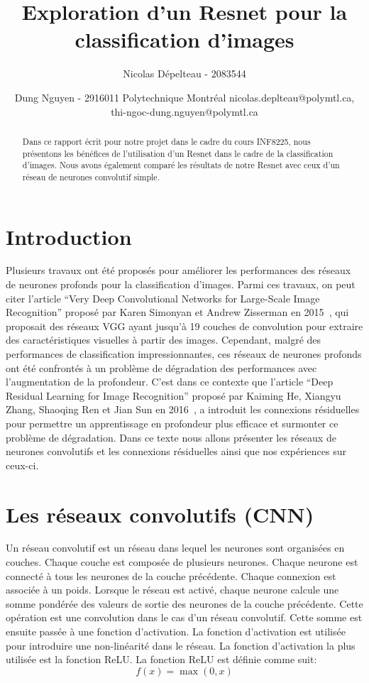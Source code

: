 \documentclass{article}
\title{Exploration d'un Resnet pour la classification d'images}
\author{
Nicolas Dépelteau - 2083544
\and
Dung Nguyen - 2916011
\affiliations{}
Polytechnique Montréal
\emails{}
nicolas.deplteau@polymtl.ca,
thi-ngoc-dung.nguyen@polymtl.ca
}
\begin{document}
\maketitle

\begin{abstract}
    Dans ce rapport écrit pour notre projet dans le cadre du cours INF8225,
    nous présentons les bénéfices de l'utilisation
    d'un Resnet dans le cadre de la classification d'images. Nous avons également comparé les
    résultats de notre Resnet avec ceux d'un réseau de neurones convolutif simple. 
\end{abstract}

\section{Introduction}

Plusieurs travaux ont été proposés pour améliorer les performances des réseaux de neurones profonds pour la classification d'images.
Parmi ces travaux, on peut citer l'article ``Very Deep Convolutional Networks for Large-Scale Image Recognition'' proposé par Karen
Simonyan et Andrew Zisserman en 2015~\cite{simonyan2015deep}, qui proposait des réseaux VGG ayant jusqu'à 19 couches de convolution pour extraire des
caractéristiques visuelles à partir des images.
Cependant, malgré des performances de classification impressionnantes, ces réseaux de neurones profonds ont été confrontés à un
problème de dégradation des performances avec l'augmentation de la profondeur.
C'est dans ce contexte que l'article ``Deep Residual Learning for Image Recognition'' proposé par Kaiming He, Xiangyu Zhang,
Shaoqing Ren et Jian Sun en 2016~\cite{resnet}, a introduit les connexions résiduelles pour permettre un apprentissage en profondeur plus efficace
et surmonter ce problème de dégradation.
Dans ce texte nous allons présenter les réseaux de neurones convolutifs et les connexions résiduelles ainsi que nos expériences
sur ceux-ci.

\section{Les réseaux convolutifs (CNN)}
Un réseau convolutif est un réseau dans lequel les neurones sont organisées en couches.
Chaque couche est composée de plusieurs neurones. Chaque neurone est connecté à tous les neurones de la couche précédente.
Chaque connexion est associée à un poids. Lorsque le réseau est activé, chaque neurone calcule une somme
pondérée des valeurs de sortie des neurones de la couche précédente.
Cette opération est une convolution dans le cas d'un réseau convolutif.
Cette somme est ensuite passée à une fonction d'activation.
La fonction d'activation est utilisée pour introduire une non-linéarité dans le réseau.
La fonction d'activation la plus utilisée est la fonction ReLU.\@
La fonction ReLU est définie comme suit:
\begin{equation}
    f(x) = \max(0, x)
\end{equation}
\end{document}
